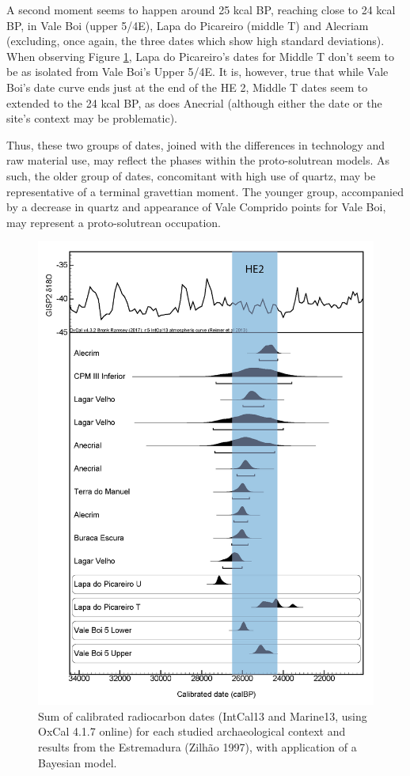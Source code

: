 \documentclass[12pt,twoside]{reedthesis}
\begin{document}
A second moment seems to happen around 25 kcal BP, reaching close to 24 kcal BP, in Vale Boi (upper 5/4E), Lapa do Picareiro (middle T) and Alecriam (excluding, once again, the three dates which show high standard deviations). When observing Figure \ref{fig:datesall}, Lapa do Picareiro's dates for Middle T don't seem to be as isolated from Vale Boi's Upper 5/4E. It is, however, true that while Vale Boi's date curve ends just at the end of the HE 2, Middle T dates seem to extended to the 24 kcal BP, as does Anecrial (although either the date or the site's context may be problematic).

Thus, these two groups of dates, joined with the differences in technology and raw material use, may reflect the phases within the proto-solutrean models. As such, the older group of dates, concomitant with high use of quartz, may be representative of a terminal gravettian moment. The younger group, accompanied by a decrease in quartz and appearance of Vale Comprido points for Vale Boi, may represent a proto-solutrean occupation.
\begin{figure}

{\centering \includegraphics[width=0.7\linewidth]{figure/c14_all} 

}

\caption{Sum of calibrated radiocarbon dates (IntCal13 and Marine13, using OxCal 4.1.7 online) for each studied archaeological context and results from the Estremadura (Zilhão 1997), with application of a Bayesian model.}\label{fig:datesall}
\end{figure}
\newpage
\end{document}

